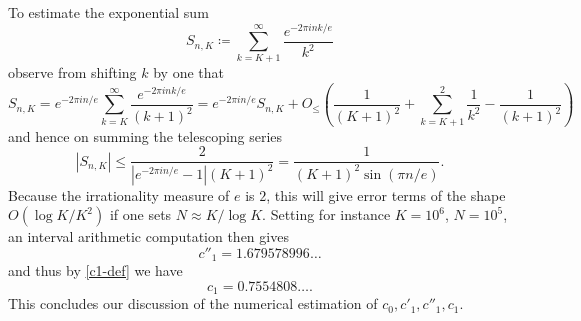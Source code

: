 \documentclass[10pt,a4paper,reqno]{amsart}
\numberwithin{equation}{section}
\theoremstyle{plain}
\theoremstyle{definition}
\begin{document}
To estimate the exponential sum
$$ S_{n,K} \coloneqq \sum_{k=K+1}^\infty \frac{e^{-2\pi i n k/e}}{k^2}$$
observe from shifting $k$ by one that
$$ S_{n,K} = e^{-2\pi i n/e} \sum_{k=K}^\infty \frac{e^{-2\pi i n k/e}}{(k+1)^2}
= e^{-2\pi i n/e} S_{n,K} + O_{\leq}\left( \frac{1}{(K+1)^2} + \sum_{k=K+1}^2 \frac{1}{k^2} -\frac{1}{(k+1)^2}\right)$$
and hence on summing the telescoping series
$$ |S_{n,K}| \leq \frac{2}{|e^{-2\pi i n/e}-1| (K+1)^2} = \frac{1}{(K+1)^2 \sin(\pi n/e)}.$$
Because the irrationality measure of $e$ is $2$, this will give error terms of the shape $O(\log K/K^2)$ if one sets $N \approx K / \log K$.  Setting for instance $K = 10^6$, $N = 10^5$, an interval arithmetic computation then gives
$$c''_1 = 1.679578996\dots$$
and thus by \eqref{c1-def} we have
$$ c_1 = 0.7554808\dots.$$
This concludes our discussion of the numerical estimation of $c_0, c'_1, c''_1, c_1$.
\end{document}
